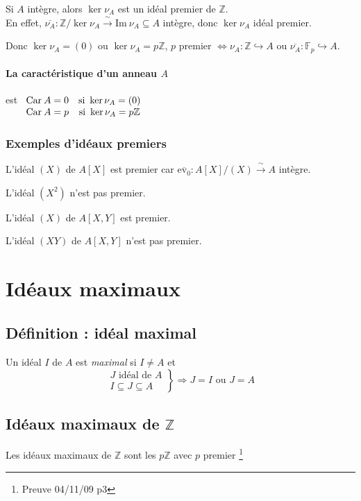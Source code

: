 \documentclass[reqno,a4paper,10pt]{report}
\makeatletter
\newcommand{\im}{\mathrm{Im}\:} %
\newcommand{\car}{\mathrm{Car}\:} %
\newcommand{\IZ}{\ensuremath{\mathbb{Z}}\xspace} %
\newcommand{\soo}{\Longrightarrow}
\newcommand{\inj}{\hookrightarrow}
\newcommand{\bij}{\overset{\!\sim}{\to}} %
\newcommand{\pfootnote}[1]{\up{(}\footnote{#1}\up{)}} %
\newcommand{\ev}[1]{\mathrm{ev}_{ #1 }}
\let\olditemize=\itemize%
\renewenvironment{itemize}{%
    \olditemize%
  }{%
    \@noparlisttrue%
    \endlist%
  }%
\makeatother
\begin{document}
Si $A$ intègre, alors $\ker \nu_A$ est un idéal premier de $\IZ$.\\
En effet, $\overline{\nu_A}:\IZ/\ker \nu_A \bij \im \nu_A \subseteq A$ intègre,
donc $\ker \nu_A$ idéal premier.

Donc $\ker \nu_A = (0)$ ou $\ker \nu_A=p\IZ$, $p$ premier $\iff \nu_A:\IZ \inj
A$ ou $\overline{\nu_A}:\mathbb{F}_p \inj A$.

\paragraph{La caractéristique d'un anneau $A$} est
$\begin{array}[t]{cc}
  \car A = 0 & \text{si } \ker \nu_A=(0)\\
  \car A = p & \text{si } \ker \nu_A=p\IZ
\end{array}$

\subsubsection{Exemples d'idéaux premiers}
\begin{itemize}
  \item L'idéal $(X)$ de $A[X]$ est premier car $\overline{\ev 0} : A[X]/(X)
    \bij A$ intègre.
  \item L'idéal $(X^2)$ n'est pas premier.
  \item L'idéal $(X)$ de $A[X,Y]$ est premier.
  \item L'idéal $(XY)$ de $A[X,Y]$ n'est pas premier.
\end{itemize}

\section{Idéaux maximaux}
\subsection{Définition : idéal maximal}
Un idéal $I$ de $A$ est \emph{maximal} si $I\neq A$ et
\[\left.
\begin{array}{r}
  J \text{ idéal de } A\\
  I \subseteq J \subseteq A
\end{array}\right\} \soo J=I \text{ ou } J=A\]

\subsection{Idéaux maximaux de $\IZ$}
Les idéaux maximaux de $\IZ$ sont les $p\IZ$ avec $p$ premier
  \pfootnote{Preuve 04/11/09 p3}
\end{document}
